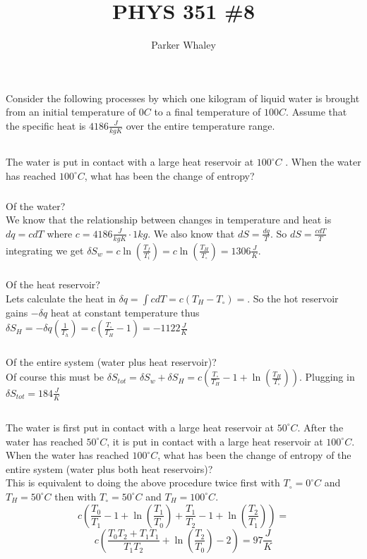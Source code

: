 \documentclass[10pt,a4paper]{article}
\author{Parker Whaley}
\title{PHYS 351 \#8}
\begin{document}
\maketitle
\section{}
Consider the following processes by which one kilogram of liquid water is brought from an initial temperature of $0C$ to a final temperature of $100C$. Assume that the specific heat is $4186 \frac{J}{kgK}$ over the entire temperature range.
\subsection{}
The water is put in contact with a large heat reservoir at $100 ^\circ C$ . When the water has reached $100 ^\circ C$, what has been the change of entropy?
\subparagraph{}
Of the water?\\
We know that the relationship between changes in temperature and heat is $dq=cdT$ where $c=4186 \frac{J}{kgK} \cdot 1kg$.  We also know that $dS=\frac{dq}{T}$.  So $dS=\frac{cdT}{T}$ integrating we get $\delta S_w=c\ln(\frac{T_f}{T_i})=c\ln(\frac{T_H}{T_\circ})=1306\frac{J}{K}$.
\subparagraph{}
Of the heat reservoir?\\
Lets calculate the heat in $\delta q=\int cdT=c(T_H-T_\circ)=$.  So the hot reservoir gains $-\delta q$ heat at constant temperature thus $\delta S_H=-\delta q (\frac{1}{T_h})=c(\frac{T_\circ}{T_H}-1)=-1122\frac{J}{K}$
\subparagraph{}
Of the entire system (water plus heat reservoir)?\\
Of course this must be $\delta S_{tot}=\delta S_w+\delta S_H=c(\frac{T_\circ}{T_H}-1+\ln(\frac{T_H}{T_\circ}))$.  Plugging in $\delta S_{tot}=184\frac{J}{K}$
\subsection{}
The water is first put in contact with a large heat reservoir at $50^\circ C$. After the water has reached $50^\circ C$, it is put in contact with a large heat reservoir at $100^\circ C$. When the water has reached $100^\circ C$, what has been the change of entropy of the entire system (water plus both heat reservoirs)?\\
This is equivalent to doing the above procedure twice first with $T_\circ=0^\circ C$ and $T_H=50^\circ C$ then with $T_\circ=50^\circ C$ and $T_H=100^\circ C$.
$$c(\frac{T_0}{T_1}-1+\ln(\frac{T_1}{T_0})+\frac{T_1}{T_2}-1+\ln(\frac{T_2}{T_1}))=$$
$$c(\frac{T_0T_2+T_1T_1}{T_1T_2}+\ln(\frac{T_2}{T_0})-2)=97\frac{J}{K}$$
\end{document}
